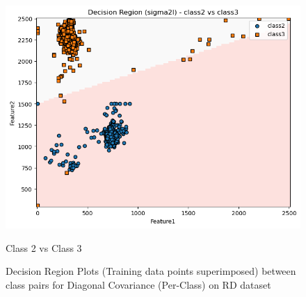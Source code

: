 \begin{figure}[H]
\begin{minipage}{0.32\linewidth}
        \includegraphics[width=\linewidth]{images/RD_Group04_images/01_sigma2i/04_decision_region_c2_c3.png}
        \caption*{Class 2 vs Class 3}
    \end{minipage}
    \caption{Decision Region Plots (Training data points superimposed) between class pairs for Diagonal Covariance (Per-Class) on RD dataset}
\end{figure}